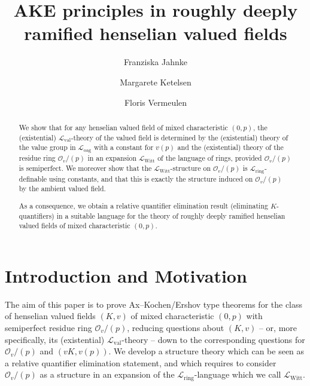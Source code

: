 \documentclass[a4paper]{amsart}
\author[F.~Jahnke]{Franziska Jahnke}
\author[M.~Ketelsen]{Margarete Ketelsen}
\author[F.~Vermeulen]{Floris Vermeulen}
\title[AKE principles in roughly deeply ramified henselian fields]{AKE principles in roughly deeply ramified henselian valued fields}
\theoremstyle{mystyle2}
\theoremstyle{mystyle}
\renewcommand{\L}{\mathcal{L}}
\newcommand{\Lring}{\L_{\mathrm{ring}}}
\newcommand{\Loag}{\L_{\mathrm{oag}}}
\newcommand{\Lval}{\L_{\mathrm{val}}}
\newcommand{\LWitt}{\L_{\mathrm{Witt}}}
\renewcommand{\O}{\mathcal{O}}
\numberwithin{equation}{section}
\begin{document}
\begin{abstract}
    We show that for any henselian valued field of mixed characteristic $(0,p)$,
    the (existential) $\Lval$-theory of the valued field is determined by
    the (existential) theory of the value group in $\Loag$ with a constant for $v(p)$
    and the (existential) theory of the residue ring $\O_v/(p)$ in an expansion
    $\LWitt$ of the language of rings, provided $\O_v/(p)$ is semiperfect.
    We moreover show that the $\LWitt$-structure on $\O_v/(p)$ is $\Lring$-definable
    using constants, and that this is exactly the structure induced on $\O_v/(p)$
    by the ambient valued field. 
    
    As a consequence, we obtain a relative quantifier 
    elimination result (eliminating $K$-quantifiers) in a suitable language 
    for the theory of roughly deeply ramified henselian valued fields
    of mixed characteristic $(0,p)$.
\end{abstract}
    \maketitle
    
    \section{Introduction and Motivation}
    The aim of this paper is to prove Ax--Kochen/Ershov type theorems for the class of henselian
    valued fields $(K,v)$ of mixed characteristic $(0,p)$ with semiperfect residue ring 
    $\O_v/(p)$, reducing questions about $(K,v)$ -- or, more specifically, its (existential) $\Lval$-theory -- 
    down to the corresponding
    questions for $\O_v/(p)$ and $(vK,v(p))$. We develop a structure theory
    which can be seen as a relative quantifier elimination
    statement, and which requires to consider $\O_v/(p)$ as a structure in an expansion 
    of the $\Lring$-language which we call $\LWitt$.
\end{document}
